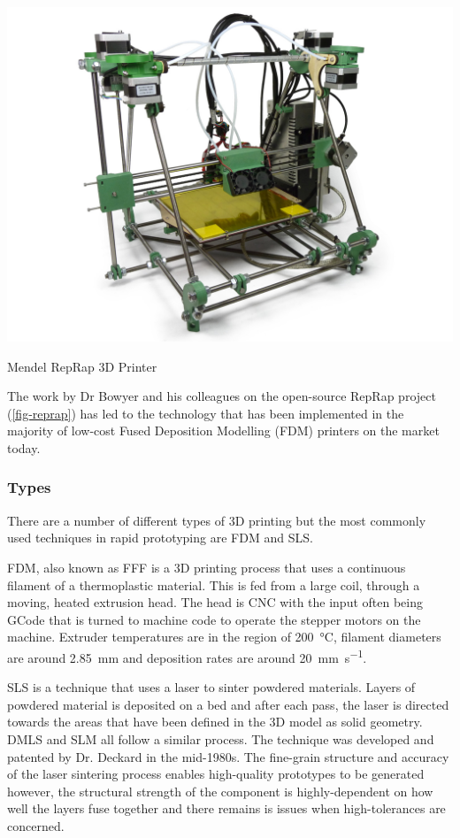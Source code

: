 \begin{marginfigure}
    \centering
    \includegraphics[width=\textwidth]{07_design_for_x/mendel.jpg}
    \caption{Mendel RepRap 3D Printer}
    \label{fig-reprap}
\end{marginfigure}

The work by Dr Bowyer and his colleagues on the open-source RepRap project (\cref{fig-reprap}) has led to the technology that has been implemented in the majority of low-cost Fused Deposition Modelling (FDM) printers on the market today.~\cite{jones2011}

\subsubsection{Types}

There are a number of different types of 3D printing but the most commonly used techniques in rapid prototyping are \acf{FDM} and \acf{SLS}.

\ac{FDM}, also known as \acf{FFF} is a 3D printing process that uses a continuous filament of a thermoplastic material. This is fed from a large coil, through a moving, heated extrusion head. The head is \acf{CNC} with the input often being GCode that is turned to machine code to operate the stepper motors on the machine. Extruder temperatures are in the region of \SI{200}{\degreeCelsius}, filament diameters are around \SI{2.85}{\milli\metre} and deposition rates are around \SI{20}{\milli\metre\per\second}.

\ac{SLS} is a technique that uses a laser to sinter powdered materials. Layers of powdered material is deposited on a bed and after each pass, the laser is directed towards the areas that have been defined in the 3D model as solid geometry. \acf{DMLS} and \acf{SLM} all follow a similar process. The technique was developed and patented by Dr. Deckard in the mid-1980s. The fine-grain structure and accuracy of the laser sintering process enables high-quality prototypes to be generated however, the structural strength of the component is highly-dependent on how well the layers fuse together and there remains is issues when high-tolerances are concerned.

